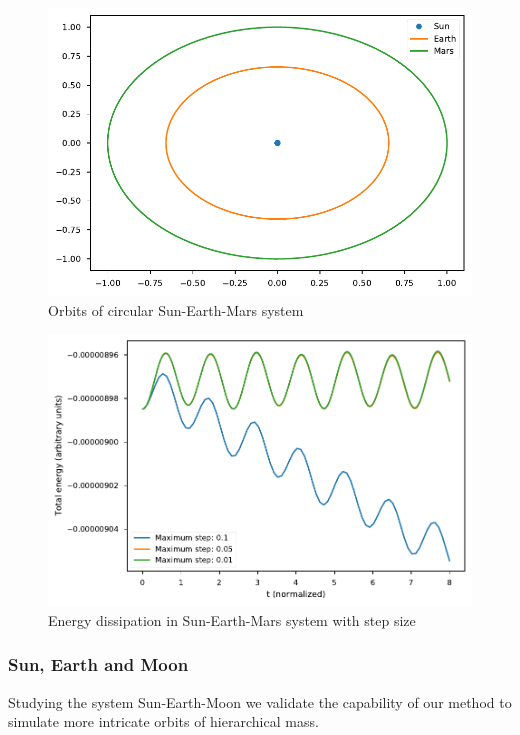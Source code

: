 \documentclass{aa}
\begin{document}
\begin{figure}
  \centering
  \includegraphics[width=\linewidth]{figs/sun_earth_mars_orbs.pdf}
  \caption{Orbits of circular Sun-Earth-Mars system}
  \label{fig:sun_earth_mars}
\end{figure}

\begin{figure}
  \centering
  \includegraphics[width=\linewidth]{figs/sun_earth_mars_energy.pdf}
  \caption{Energy dissipation in Sun-Earth-Mars system with step size}
  \label{fig:sun_earth_mars_energy}
\end{figure}


\subsubsection{Sun, Earth and Moon}
\label{sec:sun_earth_moon}

Studying the system Sun-Earth-Moon we validate the capability of our method to
simulate more intricate orbits of hierarchical mass.
\end{document}

